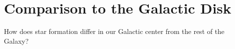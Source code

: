 \section{Comparison to the Galactic Disk}
How does star formation differ in our Galactic center from the rest of the Galaxy? 